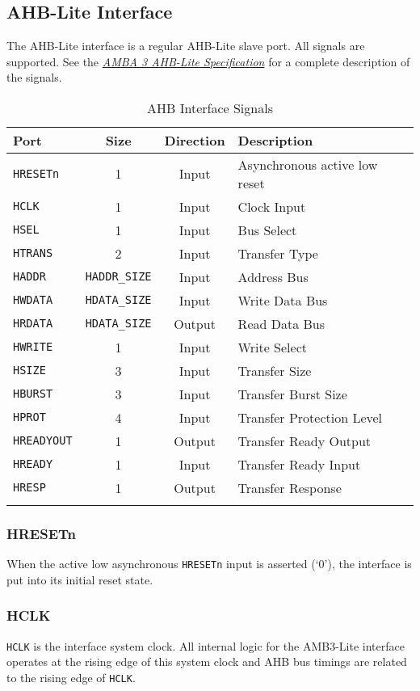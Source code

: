 \subsection{AHB-Lite Interface}

The AHB-Lite interface is a regular AHB-Lite slave port. All signals are
supported. See the
\emph{\href{https://www.arm.com/products/system-ip/amba-specifications}{AMBA
3 AHB-Lite Specification}} for a complete description of the signals.

\begin{longtable}[]{@{}lccl@{}}
\toprule
\textbf{Port} & \textbf{Size} & \textbf{Direction} & \textbf{Description}\tabularnewline
\midrule
\endhead
\texttt{HRESETn} & 1 & Input & Asynchronous active low reset\tabularnewline
\texttt{HCLK} & 1 & Input & Clock Input\tabularnewline
\texttt{HSEL} & 1 & Input & Bus Select\tabularnewline
\texttt{HTRANS} & 2 & Input & Transfer Type\tabularnewline
\texttt{HADDR} & \texttt{HADDR\_SIZE} & Input & Address Bus\tabularnewline
\texttt{HWDATA} & \texttt{HDATA\_SIZE} & Input & Write Data Bus\tabularnewline
\texttt{HRDATA} & \texttt{HDATA\_SIZE} & Output & Read Data Bus\tabularnewline
\texttt{HWRITE} & 1 & Input & Write Select\tabularnewline
\texttt{HSIZE} & 3 & Input & Transfer Size\tabularnewline
\texttt{HBURST} & 3 & Input & Transfer Burst Size\tabularnewline
\texttt{HPROT} & 4 & Input & Transfer Protection Level\tabularnewline
\texttt{HREADYOUT} & 1 & Output & Transfer Ready Output\tabularnewline
\texttt{HREADY} & 1 & Input & Transfer Ready Input\tabularnewline
\texttt{HRESP} & 1 & Output & Transfer Response\tabularnewline
\bottomrule
\caption{AHB Interface Signals}
\label{tab:AHBIF}
\end{longtable}

\subsubsection{HRESETn}

When the active low asynchronous \texttt{HRESETn} input is asserted
(`0'), the interface is put into its initial reset state.

\subsubsection{HCLK}

\texttt{HCLK} is the interface system clock. All internal logic for the
AMB3-Lite interface operates at the rising edge of this system clock and
AHB bus timings are related to the rising edge of \texttt{HCLK}.

